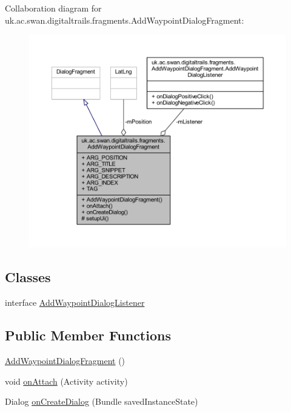 Collaboration diagram for uk.\+ac.\+swan.\+digitaltrails.\+fragments.\+Add\+Waypoint\+Dialog\+Fragment\+:
\nopagebreak
\begin{figure}[H]
\begin{center}
\leavevmode
\includegraphics[width=350pt]{classuk_1_1ac_1_1swan_1_1digitaltrails_1_1fragments_1_1_add_waypoint_dialog_fragment__coll__graph}
\end{center}
\end{figure}
\subsection*{Classes}
\begin{DoxyCompactItemize}
\item 
interface \hyperlink{interfaceuk_1_1ac_1_1swan_1_1digitaltrails_1_1fragments_1_1_add_waypoint_dialog_fragment_1_1_add_waypoint_dialog_listener}{Add\+Waypoint\+Dialog\+Listener}
\end{DoxyCompactItemize}
\subsection*{Public Member Functions}
\begin{DoxyCompactItemize}
\item 
\hyperlink{classuk_1_1ac_1_1swan_1_1digitaltrails_1_1fragments_1_1_add_waypoint_dialog_fragment_aabec076e888d5f4a16e32e0099a1c468}{Add\+Waypoint\+Dialog\+Fragment} ()
\item 
void \hyperlink{classuk_1_1ac_1_1swan_1_1digitaltrails_1_1fragments_1_1_add_waypoint_dialog_fragment_a5ac6c874b269622c809d26a370e7c4bd}{on\+Attach} (Activity activity)
\item 
Dialog \hyperlink{classuk_1_1ac_1_1swan_1_1digitaltrails_1_1fragments_1_1_add_waypoint_dialog_fragment_a4b2bc55b74b3352008d2892c3ae165cb}{on\+Create\+Dialog} (Bundle saved\+Instance\+State)
\end{DoxyCompactItemize}
